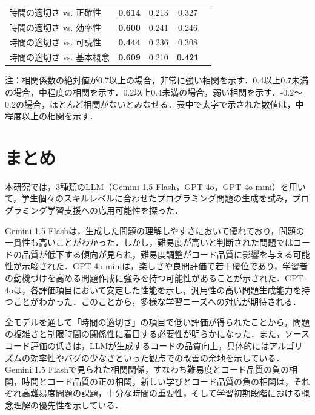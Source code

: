 \documentclass[11pt]{jreport}
\begin{document}
\begin{table}[t]
\begin{threeparttable}
\begin{tabular}{lcccc}
    \hline
    時間の適切さ vs. 正確性 & \textbf{0.614} & 0.213 & 0.327 \\
    時間の適切さ vs. 効率性 & \textbf{0.600} & 0.241 & 0.246 \\
    時間の適切さ vs. 可読性 & \textbf{0.444} & 0.236 & 0.308 \\
    時間の適切さ vs. 基本概念 & \textbf{0.609} & 0.210 & \textbf{0.421} \\
      \hline
    \end{tabular}
    \begin{tablenotes}
      \small
      \item 注：相関係数の絶対値が0.7以上の場合，非常に強い相関を示す．0.4以上0.7未満の場合，中程度の相関を示す．0.2以上0.4未満の場合，弱い相関を示す．-0.2〜0.2の場合，ほとんど相関がないとみなせる．表中で太字で示された数値は，中程度以上の相関を示す．
    \end{tablenotes}
  \end{threeparttable}
\end{table}



\chapter{まとめ}

本研究では，3種類のLLM（Gemini 1.5 Flash，GPT-4o，GPT-4o mini）を用いて，学生個々のスキルレベルに合わせたプログラミング問題の生成を試み，プログラミング学習支援への応用可能性を探った．

Gemini 1.5 Flashは，生成した問題の理解しやすさにおいて優れており，問題の一貫性も高いことがわかった．しかし，難易度が高いと判断された問題ではコードの品質が低下する傾向が見られ，難易度調整がコード品質に影響を与える可能性が示唆された．GPT-4o miniは，楽しさや良問評価で若干優位であり，学習者の動機づけを高める問題作成に強みを持つ可能性があることが示された．GPT-4oは，各評価項目において安定した性能を示し，汎用性の高い問題生成能力を持つことがわかった．このことから，多様な学習ニーズへの対応が期待される．

全モデルを通して「時間の適切さ」の項目で低い評価が得られたことから，問題の複雑さと制限時間の関係性に着目する必要性が明らかになった．また，ソースコード評価の低さは，LLMが生成するコードの品質向上，具体的にはアルゴリズムの効率性やバグの少なさといった観点での改善の余地を示している．Gemini 1.5 Flashで見られた相関関係，すなわち難易度とコード品質の負の相関，時間とコード品質の正の相関，新しい学びとコード品質の負の相関は，それぞれ高難易度問題の課題，十分な時間の重要性，そして学習初期段階における概念理解の優先性を示している．
\end{document}

